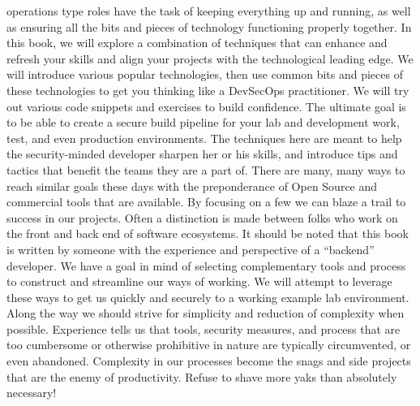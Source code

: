 operations type roles have the task of keeping everything up and running, as well as
ensuring all the bits and pieces of technology functioning properly together.
\justify{}
In this book, we will explore a combination of techniques that can enhance and refresh
your skills and align your projects with the technological leading edge. We will
introduce various popular technologies, then use common bits and pieces of
these technologies to get you thinking like a DevSecOps practitioner. We will try out
various code snippets and exercises to build confidence. The ultimate goal is to be able to
create a secure build pipeline for your lab and development work,
test, and even production environments. The techniques here are meant to help
the security-minded developer sharpen her or his skills, and introduce tips
and tactics that benefit the teams they are a part of. There are many, many
ways to reach similar goals these days with the preponderance of Open Source
and commercial tools that are available. By focusing on a few we can blaze a
trail to success in our projects.
\justify{}
Often a distinction is made between folks
who work on the front and back end of software ecosystems. It should be noted that this
book is written by someone with the
experience and perspective of a ``backend'' developer.
\justify{}
We have a goal in mind of selecting complementary tools and process to construct
and streamline our ways of working. We will attempt to leverage these ways to
get us quickly and securely to a working example lab environment. Along the
way we should strive for simplicity and reduction of complexity when possible.
Experience tells us that tools, security measures, and process that are too cumbersome
or otherwise prohibitive in nature are typically circumvented, or even abandoned.
Complexity in our processes become the snags and side projects that are the
enemy of productivity.
\justify{}
Refuse to shave more yaks\cite{yak} than absolutely necessary!
